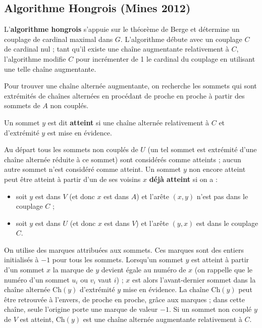 \newpage
\subsection{Algorithme Hongrois (Mines 2012)}
L'{\bf algorithme hongrois} s'appuie sur le théorème de Berge et détermine un couplage de cardinal maximal dans $G$. L'algorithme débute avec un couplage $C$ de cardinal nul ; tant qu'il existe une chaîne augmentante relativement à $C$, l'algorithme modifie $C$ pour incrémenter de 1 le cardinal du couplage en utilisant une telle chaîne augmentante.

Pour trouver une chaîne alternée augmentante, on recherche les sommets qui sont extrémités de chaînes alternées en procédant de proche en proche à partir des sommets de $A$ non couplés.

Un sommet $y$ est dit {\bf atteint} si une chaîne alternée relativement à $C$ et d'extrémité $y$ est mise en évidence. 

Au départ tous les sommets non couplés de $U$ (un tel sommet est extrémité d'une chaîne alternée réduite à ce sommet) sont considérés comme atteints ; aucun autre sommet n'est considéré comme atteint. Un sommet $y$ non encore atteint peut être atteint à partir d'un de ses voisins $x$ {\bf déjà atteint} si on a :
\begin{itemize}
  \item soit $y$ est dans $V$ (et donc $x$ est dans $A$) et l'arête $(x,y)$ n'est pas dans le couplage $C$ ;
  \item soit $y$ est dans $U$ (et donc $x$ est dans $V$) et l'arête $(y, x)$ est dans le couplage $C$.
\end{itemize}

On utilise des marques attribuées aux sommets. Ces marques sont des entiers initialisés à $-1$ pour tous les sommets. Lorsqu'un sommet $y$ est atteint à partir d'un sommet $x$ la marque de $y$ devient égale au numéro de $x$ (on rappelle que le numéro d'un sommet $u_i$ ou $v_i$ vaut $i$) ; $x$ est alors l'avant-dernier sommet dans la chaîne alternée Ch$(y)$ d'extrémité $y$ mise en évidence. La chaîne Ch$(y)$ peut être retrouvée à l'envers, de proche en proche, grâce aux marques ; dans cette chaîne, seule l'origine porte une marque de valeur $-1$. Si un sommet non couplé $y$ de $V$ est atteint, Ch$(y)$ est une chaîne alternée augmentante relativement à $C$.


